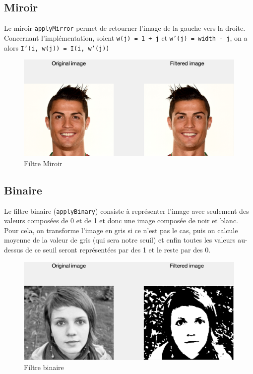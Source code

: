 \documentclass[12pt,a4paper]{article}
\begin{document}
\subsection{Miroir}
Le miroir \texttt{applyMirror} permet de retourner l'image de la gauche vers la droite. Concernant l'implémentation, soient \texttt{w(j) = 1 + j} et \texttt{w'(j) = width - j}, on a alors \texttt{I'(i, w(j)) = I(i, w'(j))}

\begin{figure}[H]
\centering
\includegraphics[scale=0.5]{img/mirror}
\caption{Filtre Miroir}
\end{figure}

\subsection{Binaire}
Le filtre binaire (\texttt{applyBinary}) consiste à représenter l'image avec seulement des valeurs composées de 0 et de 1 et donc une image composée de noir et blanc. Pour cela, on transforme l'image en gris si ce n'est pas le cas, puis on calcule moyenne de la valeur de gris (qui sera notre seuil) et enfin toutes les valeurs au-dessus de ce seuil seront représentées par des 1 et le reste par des 0.

\begin{figure}[H]
\centering
\includegraphics[scale=0.5]{img/binary}
\caption{Filtre binaire}
\end{figure}
\end{document}
